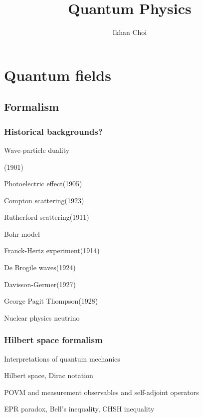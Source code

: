 \documentclass{../../large}
\begin{document}
\title{Quantum Physics}
\author{Ikhan Choi}
\maketitle
\tableofcontents


\part{Quantum fields}

\chapter{Formalism}


\section{Historical backgrounds?}
Wave-particle duality
\begin{prb}
(1901)
\end{prb}
\begin{prb}
\item Photoelectric effect(1905)
\item Compton scattering(1923)
\end{prb}
\begin{prb}
\begin{parts}
\item Rutherford scattering(1911)
\item Bohr model
\item Franck-Hertz experiment(1914)
\item De Brogile waves(1924)
\end{parts}
\end{prb}
\begin{prb}
\begin{parts}
\item Davisson-Germer(1927)
\item George Pagit Thompson(1928)
\end{parts}
\end{prb}

Nuclear physics
neutrino


\section{Hilbert space formalism}

Interpretations of quantum mechanics
\begin{prb}
Hilbert space, Dirac notation
\end{prb}
\begin{prb}[Pictures]
\end{prb}
\begin{prb}
POVM and measurement
observables and self-adjoint operators
\end{prb}
\begin{prb}
EPR paradox, Bell's inequality, CHSH inequality
\end{prb}
\end{document}
